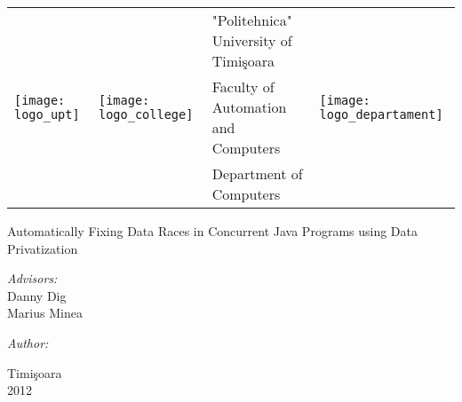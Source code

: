 \graphicspath{{content/title/figures/}}

\begin{titlepage}

\begin{center}

\begin{tabular}{ p{2cm} p{2cm} p{8cm} p{2cm}}
\multirow{3}{*}{\texttt{[image: logo\_upt]}} &
\multirow{3}{*}{\texttt{[image: logo\_college]}} &
"Politehnica" University of Timi\c{s}oara  &
\multirow{3}{*}{\texttt{[image: logo\_departament]}} \\
& & Faculty of Automation and Computers & \\
& & Department of Computers & \\
\end{tabular}

\vspace{5cm}

\Huge

Automatically Fixing Data Races in Concurrent Java Programs using Data
Privatization

\large

\vspace{1.6cm}


\vspace{4cm}

\begin{minipage}{0.55\textwidth}
\begin{flushleft} \large
\emph{Advisors:} \\
{\sc Danny Dig} \\
{\sc Marius Minea }
\end{flushleft}
\end{minipage}
\begin{minipage}{0.4\textwidth}
\begin{flushright} \large
\emph{Author:}\\
\end{flushright}
\end{minipage}


\vfill

\normalsize

Timi\c{s}oara \\
2012

\end{center}

\end{titlepage}